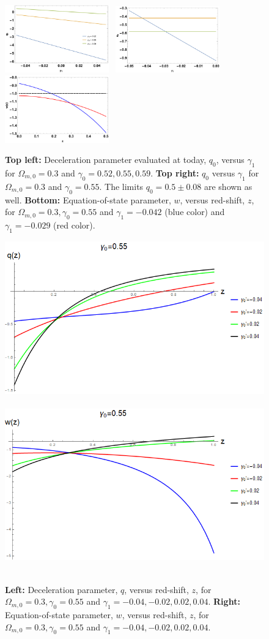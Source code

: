 \documentclass[aps,prd,amsmath,amssymb]{revtex4}
\begin{document}
\begin{figure}[ht]
\centering
\includegraphics[width=0.4\textwidth]{q0VSgamma1.pdf}   \
\includegraphics[width=0.4\textwidth]{Bounds.pdf}   \
\includegraphics[width=0.4\textwidth]{wVSz_Extremes}   \
\caption{
{\bf Top left:} Deceleration parameter evaluated at today, $q_0$, versus $\gamma_1$ for $\Omega_{m,0}=0.3$ and $\gamma_0=0.52,0.55,0.59$.
{\bf Top right:} $q_0$ versus $\gamma_1$ for $\Omega_{m,0}=0.3$ and $\gamma_0=0.55$. The limits $q_0=0.5 \pm 0.08$
are shown as well.
{\bf Bottom:} Equation-of-state parameter, $w$, versus red-shift, $z$, for $\Omega_{m,0}=0.3, \gamma_0=0.55$ and 
$\gamma_1=-0.042$ (blue color) and $\gamma_1=-0.029$ (red color).
}
\label{fig:1}
\end{figure}


\begin{figure}
\centering
\includegraphics[width=0.4\linewidth]{q_gamma055.png} \
\includegraphics[width=0.4\linewidth]{w_gamma055.png} \
\caption{
{\bf Left:} Deceleration parameter, $q$, versus red-shift, $z$, for $\Omega_{m,0}=0.3, \gamma_0=0.55$ and 
$\gamma_1=-0.04 ,-0.02, 0.02, 0.04$.
{\bf Right:} Equation-of-state parameter, $w$, versus red-shift, $z$, for $\Omega_{m,0}=0.3, \gamma_0=0.55$ and 
$\gamma_1=-0.04, -0.02, 0.02, 0.04$.
}
\label{fig:2}
\end{figure}
\end{document}
